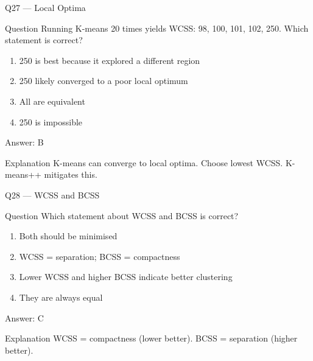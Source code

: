 \documentclass[aspectratio=169,8pt]{beamer}
\begin{document}
	\begin{frame}{Q27 --- Local Optima}
		\begin{block}{Question}
			Running K-means 20 times yields WCSS: 98, 100, 101, 102, 250. Which statement is correct?
		\end{block}
		\begin{enumerate}
			\item 250 is best because it explored a different region
			\item 250 likely converged to a poor local optimum
			\item All are equivalent
			\item 250 is impossible
		\end{enumerate}
		\begin{exampleblock}{Answer: B}\end{exampleblock}
		\begin{block}{Explanation}
			K-means can converge to local optima. Choose lowest WCSS. K-means++ mitigates this.
		\end{block}
	\end{frame}
	
	\begin{frame}{Q28 --- WCSS and BCSS}
		\begin{block}{Question}
			Which statement about WCSS and BCSS is correct?
		\end{block}
		\begin{enumerate}
			\item Both should be minimised
			\item WCSS = separation; BCSS = compactness
			\item Lower WCSS and higher BCSS indicate better clustering
			\item They are always equal
		\end{enumerate}
		\begin{exampleblock}{Answer: C}\end{exampleblock}
		\begin{block}{Explanation}
			WCSS = compactness (lower better). BCSS = separation (higher better).
		\end{block}
	\end{frame}
	
\end{document}
